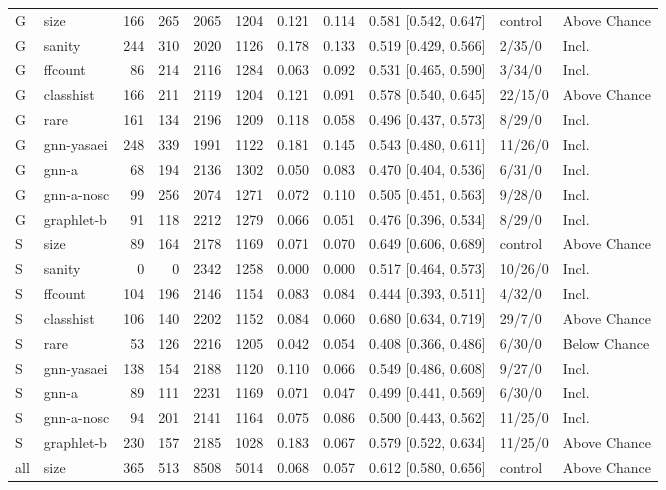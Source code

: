 \begin{tabular}{@{}llrrrrrrrll@{}}
\midrule
G & size & 166 & 265 & 2065 & 1204 & 0.121 & 0.114 & 0.581 [0.542, 0.647] & control & Above Chance \\
G & sanity & 244 & 310 & 2020 & 1126 & 0.178 & 0.133 & 0.519 [0.429, 0.566] & 2/35/0 & Incl. \\
G & ffcount & 86 & 214 & 2116 & 1284 & 0.063 & 0.092 & 0.531 [0.465, 0.590] & 3/34/0 & Incl. \\
G & classhist & 166 & 211 & 2119 & 1204 & 0.121 & 0.091 & 0.578 [0.540, 0.645] & 22/15/0 & Above Chance \\
G & rare & 161 & 134 & 2196 & 1209 & 0.118 & 0.058 & 0.496 [0.437, 0.573] & 8/29/0 & Incl. \\
G & gnn-yasaei & 248 & 339 & 1991 & 1122 & 0.181 & 0.145 & 0.543 [0.480, 0.611] & 11/26/0 & Incl. \\
G & gnn-a & 68 & 194 & 2136 & 1302 & 0.050 & 0.083 & 0.470 [0.404, 0.536] & 6/31/0 & Incl. \\
G & gnn-a-nosc & 99 & 256 & 2074 & 1271 & 0.072 & 0.110 & 0.505 [0.451, 0.563] & 9/28/0 & Incl. \\
G & graphlet-b & 91 & 118 & 2212 & 1279 & 0.066 & 0.051 & 0.476 [0.396, 0.534] & 8/29/0 & Incl. \\
\midrule
S & size & 89 & 164 & 2178 & 1169 & 0.071 & 0.070 & 0.649 [0.606, 0.689] & control & Above Chance \\
S & sanity & 0 & 0 & 2342 & 1258 & 0.000 & 0.000 & 0.517 [0.464, 0.573] & 10/26/0 & Incl. \\
S & ffcount & 104 & 196 & 2146 & 1154 & 0.083 & 0.084 & 0.444 [0.393, 0.511] & 4/32/0 & Incl. \\
S & classhist & 106 & 140 & 2202 & 1152 & 0.084 & 0.060 & 0.680 [0.634, 0.719] & 29/7/0 & Above Chance \\
S & rare & 53 & 126 & 2216 & 1205 & 0.042 & 0.054 & 0.408 [0.366, 0.486] & 6/30/0 & Below Chance \\
S & gnn-yasaei & 138 & 154 & 2188 & 1120 & 0.110 & 0.066 & 0.549 [0.486, 0.608] & 9/27/0 & Incl. \\
S & gnn-a & 89 & 111 & 2231 & 1169 & 0.071 & 0.047 & 0.499 [0.441, 0.569] & 6/30/0 & Incl. \\
S & gnn-a-nosc & 94 & 201 & 2141 & 1164 & 0.075 & 0.086 & 0.500 [0.443, 0.562] & 11/25/0 & Incl. \\
S & graphlet-b & 230 & 157 & 2185 & 1028 & 0.183 & 0.067 & 0.579 [0.522, 0.634] & 11/25/0 & Above Chance \\
\midrule
all & size & 365 & 513 & 8508 & 5014 & 0.068 & 0.057 & 0.612 [0.580, 0.656] & control & Above Chance \\

\end{tabular}
